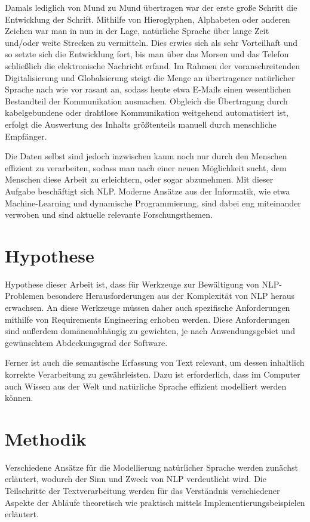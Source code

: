 \documentclass[12pt]{report}
\begin{document}
Damals lediglich von Mund zu Mund übertragen war der erste große Schritt die Entwicklung der Schrift. Mithilfe von Hieroglyphen, Alphabeten oder anderen Zeichen war man in nun in der Lage, natürliche Sprache über lange Zeit und/oder weite Strecken zu vermitteln. Dies erwies sich als sehr Vorteilhaft und so setzte sich die Entwicklung fort, bis man über das Morsen und das Telefon schließlich die elektronische Nachricht erfand. 
Im Rahmen der voranschreitenden Digitalisierung und Globalsierung steigt die Menge an übertragener natürlicher Sprache nach wie vor rasant an, sodass heute etwa E-Mails einen wesentlichen Bestandteil der Kommunikation ausmachen. Obgleich die Übertragung durch kabelgebundene oder drahtlose Kommunikation weitgehend automatisiert ist, erfolgt die Auswertung des Inhalts größtenteils manuell durch menschliche Empfänger.

Die Daten selbst sind jedoch inzwischen kaum noch nur durch den Menschen effizient zu verarbeiten, sodass man nach einer neuen Möglichkeit sucht, dem Menschen diese Arbeit zu erleichtern, oder sogar abzunehmen. Mit dieser Aufgabe beschäftigt sich NLP. Moderne Ansätze aus der Informatik, wie etwa Machine-Learning und dynamische Programmierung, sind dabei eng miteinander verwoben und sind aktuelle relevante Forschungsthemen.

\section{Hypothese}
Hypothese dieser Arbeit ist, dass für Werkzeuge zur Bewältigung von NLP-Problemen besondere Herausforderungen aus der Komplexität von NLP heraus erwachsen. An diese Werkzeuge müssen daher auch spezifische Anforderungen mithilfe von Requirements Engineering erhoben werden. Diese Anforderungen sind außerdem domänenabhängig zu gewichten, je nach Anwendungsgebiet und gewünschtem Abdeckungsgrad der Software.

Ferner ist auch die semantische Erfassung von Text relevant, um dessen inhaltlich korrekte Verarbeitung zu gewährleisten. Dazu ist erforderlich, dass im Computer auch Wissen aus der Welt und natürliche Sprache effizient modelliert werden können.

\section{Methodik}
Verschiedene Ansätze für die Modellierung natürlicher Sprache werden zunächst erläutert, wodurch der Sinn und Zweck von NLP verdeutlicht wird. Die Teilschritte der Textverarbeitung werden für das Verständnis verschiedener Aspekte der Abläufe theoretisch wie praktisch mittels Implementierungsbeispielen erläutert.
\end{document}
